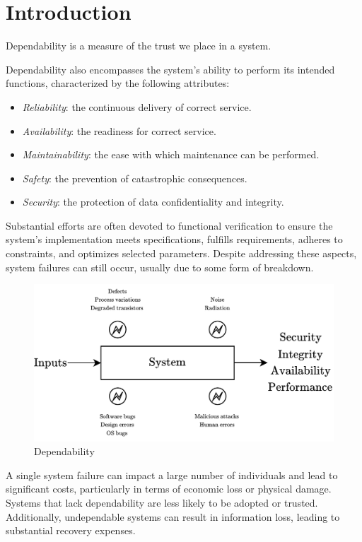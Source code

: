 \section{Introduction}

\begin{definition}
    Dependability is a measure of the trust we place in a system.
\end{definition}
Dependability also encompasses the system's ability to perform its intended functions, characterized by the following attributes:
\begin{itemize}
    \item \textit{Reliability}: the continuous delivery of correct service.
    \item \textit{Availability}: the readiness for correct service.
    \item \textit{Maintainability}: the ease with which maintenance can be performed.
    \item \textit{Safety}: the prevention of catastrophic consequences.
    \item \textit{Security}: the protection of data confidentiality and integrity.
\end{itemize}

Substantial efforts are often devoted to functional verification to ensure the system's implementation meets specifications, fulfills requirements, adheres to constraints, and optimizes selected parameters. 
Despite addressing these aspects, system failures can still occur, usually due to some form of breakdown.
\begin{figure}[H]
    \centering
    \includegraphics[width=0.75\linewidth]{images/dep.png}
    \caption{Dependability}
\end{figure}
A single system failure can impact a large number of individuals and lead to significant costs, particularly in terms of economic loss or physical damage. 
Systems that lack dependability are less likely to be adopted or trusted. 
Additionally, undependable systems can result in information loss, leading to substantial recovery expenses.